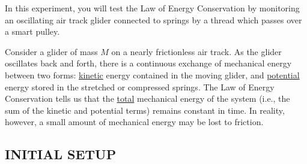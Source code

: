 In this experiment, you will test the Law of Energy Conservation by monitoring an oscillating air track glider connected to springs by a thread which passes over a smart pulley.

Consider a glider of mass \(M\) on a nearly frictionless air track.  As the glider oscillates back and forth, there is a continuous exchange of mechanical energy between two forms: \ul{kinetic} energy contained in the moving glider, and \ul{potential} energy stored in the stretched or compressed springs.  The Law of Energy Conservation tells us that the \ul{total} mechanical energy of the system (i.e., the sum of the kinetic and potential terms) remains constant in time.  In reality, however, a small amount of mechanical energy may be lost to friction.

\subsection*{INITIAL SETUP}

